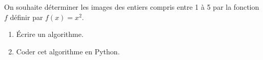 
On souhaite déterminer les images des entiers compris entre 1 à 5 par la fonction $f$ définir par $f(x)=x^2$.
\begin{enumerate}
\item Écrire un algorithme.
\item Coder cet algorithme en Python.
\end{enumerate}


